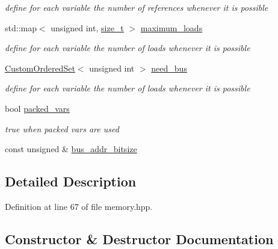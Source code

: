 \begin{DoxyCompactItemize}
\begin{DoxyCompactList}\small\item\em define for each variable the number of references whenever it is possible \end{DoxyCompactList}\item 
std\+::map$<$ unsigned int, \hyperlink{tutorial__fpt__2017_2intro_2sixth_2test_8c_a7c94ea6f8948649f8d181ae55911eeaf}{size\+\_\+t} $>$ \hyperlink{classmemory_a7723dbe3d9d2f93d48e565757d3a6822}{maximum\+\_\+loads}
\begin{DoxyCompactList}\small\item\em define for each variable the number of loads whenever it is possible \end{DoxyCompactList}\item 
\hyperlink{classCustomOrderedSet}{Custom\+Ordered\+Set}$<$ unsigned int $>$ \hyperlink{classmemory_aa5d90978b5d5147fa086c0e2f507f415}{need\+\_\+bus}
\begin{DoxyCompactList}\small\item\em define for each variable the number of loads whenever it is possible \end{DoxyCompactList}\item 
bool \hyperlink{classmemory_afe6c94e7d3da0b12ac0bf2bbbf11d934}{packed\+\_\+vars}
\begin{DoxyCompactList}\small\item\em true when packed vars are used \end{DoxyCompactList}\item 
const unsigned \& \hyperlink{classmemory_acb8126266d6dbffc611a67b26feb8d97}{bus\+\_\+addr\+\_\+bitsize}
\end{DoxyCompactItemize}


\subsection{Detailed Description}


Definition at line 67 of file memory.\+hpp.



\subsection{Constructor \& Destructor Documentation}
\mbox{\label{classmemory_a4944f160b2ac6d7b7c212beeb606bd7f}} 
